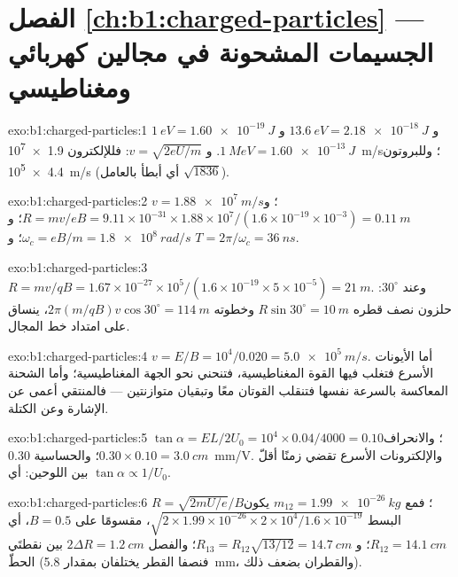\section*{الفصل \ref{ch:b1:charged-particles} --- الجسيمات المشحونة في مجالين كهربائي ومغناطيسي}

\begin{solution}{exo:b1:charged-particles:1}
$\qty{1}{eV} = \qty{1.60e-19}{J}$ و $\qty{13.6}{eV} = \qty{2.18e-18}{J}$ و
$\qty{1}{MeV} = \qty{1.60e-13}{J}$. و $v = \sqrt{2eU/m}$: فللإلكترون
\qty{1.9e7}{m/s}؛ وللبروتون \qty{4.4e5}{m/s} (أي أبطأ بالعامل $\sqrt{1836}$).
\end{solution}

\begin{solution}{exo:b1:charged-particles:2}
$v = \qty{1.88e7}{m/s}$؛ و $R = mv/eB = 9.11\times10^{-31} \times 1.88\times10^7/
(1.6\times10^{-19} \times 10^{-3}) = \qty{0.11}{m}$؛ و $\omega_c = eB/m =
\qty{1.8e8}{rad/s}$؛ و $T = 2\pi/\omega_c = \qty{36}{ns}$.
\end{solution}

\begin{solution}{exo:b1:charged-particles:3}
$R = mv/qB = 1.67\times10^{-27} \times 10^5/(1.6\times10^{-19} \times 5\times
10^{-5}) = \qty{21}{m}$. وعند $30^\circ$: حلزون نصف قطره $R\sin 30^\circ
= \qty{10}{m}$ وخطوته $2\pi(m/qB)v\cos 30^\circ = \qty{114}{m}$، ينساق
على امتداد خط المجال.
\end{solution}

\begin{solution}{exo:b1:charged-particles:4}
$v = E/B = 10^4/0.020 = \qty{5.0e5}{m/s}$. أما الأيونات الأسرع فتغلب فيها القوة
المغناطيسية، فتنحني نحو الجهة المغناطيسية؛ وأما الشحنة المعاكسة بالسرعة
نفسها فتنقلب القوتان معًا وتبقيان متوازنتين --- فالمنتقي أعمى عن
الإشارة وعن الكتلة.
\end{solution}

\begin{solution}{exo:b1:charged-particles:5}
$\tan\alpha = EL/2U_0 = 10^4 \times 0.04/4000 = 0.10$؛ والانحراف
$0.30 \times 0.10 = \qty{3.0}{cm}$؛ والحساسية \qty{0.30}{mm/V}. والإلكترونات
الأسرع تقضي زمنًا أقلّ بين اللوحين: أي $\tan\alpha \propto 1/U_0$.
\end{solution}

\begin{solution}{exo:b1:charged-particles:6}
$R = \sqrt{2mU/e}/B$؛ فمع $m_{12} = \qty{1.99e-26}{kg}$ يكون البسط
$\sqrt{2 \times 1.99\times10^{-26} \times 2\times10^4/1.6\times10^{-19}}$،
مقسومًا على $B = 0.5$، أي $R_{12} = \qty{14.1}{cm}$؛
و $R_{13} = R_{12}\sqrt{13/12} = \qty{14.7}{cm}$؛ والفصل $2\Delta R =
\qty{1.2}{cm}$ بين نقطتَي الحطّ (فنصفا القطر يختلفان بمقدار \qty{5.8}{mm}،
والقطران بضعف ذلك).
\end{solution}

